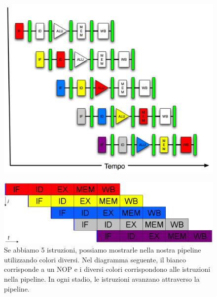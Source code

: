 \begin{frame}
		
		\begin{figure}[htbp]
		    \centering
		    \begin{minipage}{0.49\textwidth}
		        \centering
		        \includegraphics[width=1.0\linewidth]{images/7_pipeline/pipeline_in_time.png}
		        \label{fig:pipeline_pipeline_in_time}
		    \end{minipage}
		    \hfill
		    \begin{minipage}{0.49\textwidth}
		        \centering 
				\includegraphics[width=1.0\linewidth]{images/7_pipeline/pipeline_five_stages.png}
		    \end{minipage}
		    \caption{Se abbiamo 5 istruzioni, possiamo mostrarle nella nostra pipeline utilizzando colori diversi. Nel diagramma seguente, il bianco corrisponde a un NOP e i diversi colori corrispondono alle istruzioni nella pipeline. In ogni stadio, le istruzioni avanzano attraverso la pipeline.}
		    \label{fig:pipeline_pipeline_in_time}
		\end{figure}
		

\end{frame}


